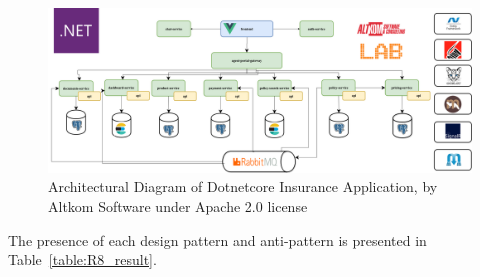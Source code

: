 \documentclass{Configuration_Files/PoliMi3i_thesis}
\begin{document}
\begin{figure}[H]
\centering
\includegraphics[width=1\textwidth]{myImages/R8.png}
\caption{Architectural Diagram of Dotnetcore Insurance Application, by Altkom Software under Apache 2.0 license}
\label{fig:R8_arch}
\end{figure}

The presence of each design pattern and anti-pattern is presented in Table~\ref{table:R8_result}.
\end{document}
